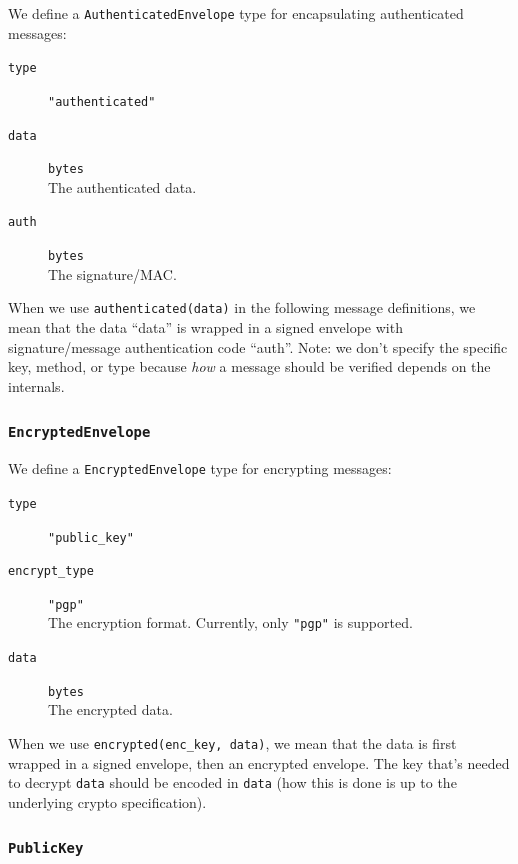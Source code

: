 \documentclass[pdftex,12pt,a4papaer,twoside,notitlepage]{report}
\begin{document}
We define a \texttt{AuthenticatedEnvelope} type for encapsulating authenticated messages:

\begin{leftbar}
\begin{description}
\item[\texttt{type}] \verb="authenticated"=
\item[\texttt{data}] \texttt{bytes} \\
  The authenticated data.
\item[\texttt{auth}] \texttt{bytes} \\
  The signature/MAC.
\end{description}
\end{leftbar}

When we use \verb=authenticated(data)= in the following message definitions, we
mean that the data ``data'' is wrapped in a signed envelope with
signature/message authentication code ``auth''. Note: we don't specify the
specific key, method, or type because \emph{how} a message should be verified
depends on the internals.

\subsubsection{\texttt{EncryptedEnvelope}}

We define a \texttt{EncryptedEnvelope} type for encrypting messages:
\begin{leftbar}
\begin{description}
\item[\texttt{type}] \verb="public_key"=
\item[\texttt{encrypt\_type}] \verb="pgp"= \\
  The encryption format. Currently, only \verb="pgp"= is supported.
\item[\texttt{data}] \texttt{bytes} \\
  The encrypted data.
\end{description}
\end{leftbar}

When we use \verb=encrypted(enc_key, data)=, we mean that the data is first
wrapped in a signed envelope, then an encrypted envelope. The key that's needed
to decrypt \texttt{data} should be encoded in \texttt{data} (how this is done is
up to the underlying crypto specification).

\subsubsection{\texttt{PublicKey}}
\end{document}
